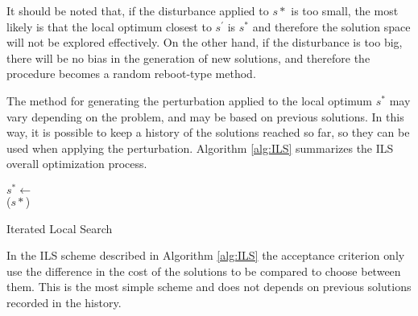 It should be noted that, if the disturbance applied to $s*$ is too small, the most likely is that the local optimum closest to $s^\prime$ is $s^*$ and therefore the solution space will not be explored effectively. On the other hand, if the disturbance is too big, there will be no bias in the generation of new solutions, and therefore the procedure becomes a random reboot-type method.


The method for generating the perturbation applied to the local optimum $s^*$ may vary depending on the problem, and may be based on previous solutions. In this way, it is possible to keep a history of the solutions reached so far, so they can be used when applying the perturbation. Algorithm \ref{alg:ILS} summarizes the ILS overall optimization process.

\begin{algorithm}
	\SetNlSkip{0.5em}
	\BlankLine
	$s^* \leftarrow$ \\
	\BlankLine
	\KwRet ($s*$)
	
	\caption{Iterated Local Search}\label{alg:ILS}
\end{algorithm}

In the ILS scheme described in Algorithm \ref{alg:ILS} the acceptance criterion only use the difference in the cost of the solutions to be compared to choose between them. This is the most simple scheme and does not depends on previous solutions recorded in the history.